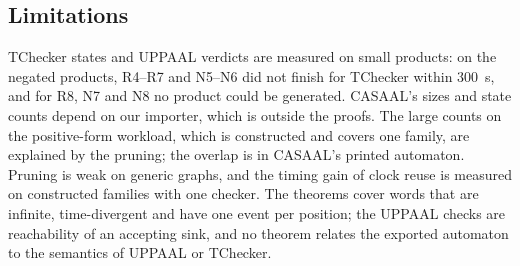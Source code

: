 \subsection{Limitations}
TChecker states and UPPAAL verdicts are measured on small products: on the negated products, R4--R7 and N5--N6 did not finish for TChecker within 300~s, and for R8, N7 and N8 no product could be generated. CASAAL's sizes and state counts depend on our importer, which is outside the proofs. The large counts on the positive-form workload, which is constructed and covers one family, are explained by the pruning; the overlap is in CASAAL's printed automaton. Pruning is weak on generic graphs, and the timing gain of clock reuse is measured on constructed families with one checker. The theorems cover words that are infinite, time-divergent and have one event per position; the UPPAAL checks are reachability of an accepting sink, and no theorem relates the exported automaton to the semantics of UPPAAL or TChecker.